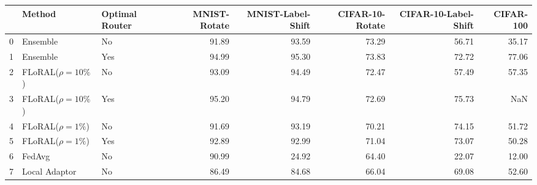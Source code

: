 \begin{tabular}{lllrrrrr}
\toprule
 & Method & Optimal Router & MNIST-Rotate & MNIST-Label-Shift & CIFAR-10-Rotate & CIFAR-10-Label-Shift & CIFAR-100 \\
\midrule
0 & Ensemble & No & 91.89 & 93.59 & 73.29 & 56.71 & 35.17 \\
1 & Ensemble & Yes & 94.99 & 95.30 & 73.83 & 72.72 & 77.06 \\
2 & FLoRAL($\rho=10\%$) & No & 93.09 & 94.49 & 72.47 & 57.49 & 57.35 \\
3 & FLoRAL($\rho=10\%$) & Yes & 95.20 & 94.79 & 72.69 & 75.73 & NaN \\
4 & FLoRAL($\rho=1\%$) & No & 91.69 & 93.19 & 70.21 & 74.15 & 51.72 \\
5 & FLoRAL($\rho=1\%$) & Yes & 92.89 & 92.99 & 71.04 & 73.07 & 50.28 \\
6 & FedAvg & No & 90.99 & 24.92 & 64.40 & 22.07 & 12.00 \\
7 & Local Adaptor & No & 86.49 & 84.68 & 66.04 & 69.08 & 52.60 \\
\bottomrule
\end{tabular}
